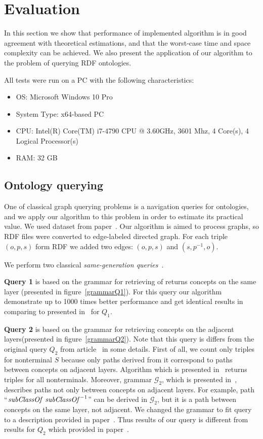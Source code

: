\section{Evaluation}

In this section we show that performance of implemented algorithm is in good agreement with theoretical estimations, and that the worst-case time and space complexity can be achieved.
We also present the application of our algorithm to the problem of querying RDF ontologies.

All tests were run on a PC with the following characteristics:
\begin{itemize}
\item OS: Microsoft Windows 10 Pro
\item System Type: x64-based PC
\item CPU: Intel(R) Core(TM) i7-4790 CPU @ 3.60GHz, 3601 Mhz, 4 Core(s), 4 Logical Processor(s)
\item RAM: 32 GB
\end{itemize}


\subsection{Ontology querying}

One of classical graph querying problems is a navigation queries for ontologies, and we apply our algorithm to this problem in order to estimate its practical value.
We used dataset from paper~\cite{CFGonRDF}.
Our algorithm is aimed to process graphs, so RDF files were converted to edge-labeled directed graph.
For each triple $(o,p,s)$ form RDF we added two edges: $(o,p,s)$ and $(s,p^{-1},o)$.

We perform two classical \textit{same-generation queries}~\cite{FndDB}.

\textbf{Query 1} is based on the grammar for retrieving of returns concepts on the same layer (presented in figure~\ref{grammarQ1}).
For this query our algorithm demonstrate up to 1000 times better performance and get identical results in comparing to presented in~\cite{CFGonRDF} for $Q_1$. 

\textbf{Query 2} is based on the grammar for retrieving concepts on the adjacent layers(presented in figure~\ref{grammarQ2}). 
Note that this query is differs from the original query $Q_2$ from article~\cite{CFGonRDF} in some details.
First of all, we count only triples for nonterminal $S$ because only paths derived from it correspond to paths between concepts on adjacent layers.
Algorithm which is presented in~\cite{CFGonRDF} returns triples for all nonterminals.
Moreover, grammar $\mathcal{G}_2$, which is presented in~\cite{CFGonRDF}, describes paths not only between concepts on adjacent layers.
For example, path ``$\text{\textit{subClassOf} \textit{subClassOf}}^{-1}$'' can be derived in $\mathcal{G}_2$, but it is a path between concepts on the same layer, not adjacent.
We changed the grammar to fit query to a description provided in paper~\cite{CFGonRDF}. 
Thus results of our query is different from results for $Q_2$ which provided in paper~\cite{CFGonRDF}.

